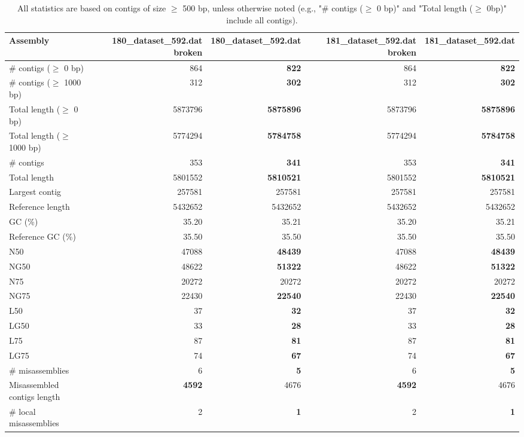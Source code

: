 \documentclass[12pt,a4paper]{article}
\begin{document}
\begin{table}[ht]
\begin{center}
\caption{All statistics are based on contigs of size $\geq$ 500 bp, unless otherwise noted (e.g., "\# contigs ($\geq$ 0 bp)" and "Total length ($\geq$ 0bp)" include all contigs).}
\begin{tabular}{|l*{4}{|r}|}
\hline
Assembly & 180\_dataset\_592.dat broken & 180\_dataset\_592.dat & 181\_dataset\_592.dat broken & 181\_dataset\_592.dat \\ \hline
\# contigs ($\geq$ 0 bp) & 864 & {\bf 822} & 864 & {\bf 822} \\ \hline
\# contigs ($\geq$ 1000 bp) & 312 & {\bf 302} & 312 & {\bf 302} \\ \hline
Total length ($\geq$ 0 bp) & 5873796 & {\bf 5875896} & 5873796 & {\bf 5875896} \\ \hline
Total length ($\geq$ 1000 bp) & 5774294 & {\bf 5784758} & 5774294 & {\bf 5784758} \\ \hline
\# contigs & 353 & {\bf 341} & 353 & {\bf 341} \\ \hline
Total length & 5801552 & {\bf 5810521} & 5801552 & {\bf 5810521} \\ \hline
Largest contig & 257581 & 257581 & 257581 & 257581 \\ \hline
Reference length & 5432652 & 5432652 & 5432652 & 5432652 \\ \hline
GC (\%) & 35.20 & 35.21 & 35.20 & 35.21 \\ \hline
Reference GC (\%) & 35.50 & 35.50 & 35.50 & 35.50 \\ \hline
N50 & 47088 & {\bf 48439} & 47088 & {\bf 48439} \\ \hline
NG50 & 48622 & {\bf 51322} & 48622 & {\bf 51322} \\ \hline
N75 & 20272 & 20272 & 20272 & 20272 \\ \hline
NG75 & 22430 & {\bf 22540} & 22430 & {\bf 22540} \\ \hline
L50 & 37 & {\bf 32} & 37 & {\bf 32} \\ \hline
LG50 & 33 & {\bf 28} & 33 & {\bf 28} \\ \hline
L75 & 87 & {\bf 81} & 87 & {\bf 81} \\ \hline
LG75 & 74 & {\bf 67} & 74 & {\bf 67} \\ \hline
\# misassemblies & 6 & {\bf 5} & 6 & {\bf 5} \\ \hline
Misassembled contigs length & {\bf 4592} & 4676 & {\bf 4592} & 4676 \\ \hline
\# local misassemblies & 2 & {\bf 1} & 2 & {\bf 1} \\ \hline

\end{tabular}
\end{center}
\end{table}
\end{document}
